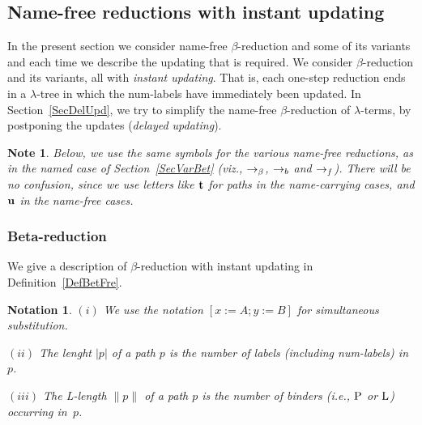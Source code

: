 \documentclass{article}
\theoremstyle{plain}
\newtheorem{Not}[The]{Notation}
\newtheorem{Note}[The]{Note}
\theoremstyle{definition}
\begin{document}
\subsection{Name-free reductions with instant updating}

In the present section we consider name-free $\beta$-reduction and some of its variants and each time we describe the updating that is required. We consider $\beta$-reduction and its variants, all with {\it instant updating\/}. That is, each one-step reduction ends in a $\lambda$-tree in which the num-labels have immediately been updated. In Section~\ref{SecDelUpd}, we try to simplify the name-free $\beta$-reduction of $\lambda$-terms, by postponing the updates ({\it delayed
updating\/}).

\begin{Note}
Below, we use the same symbols for the various name-free reductions, as in the {\em named\/} case of Section~\ref{SecVarBet} (viz., $\rightarrow_{\beta}$, $\rightarrow_b$ and $\rightarrow_f$). There will be no confusion, since we use letters like ${\bf t}$ for paths in the name-carrying cases, and ${\bf u}$ in the name-free cases.
\end{Note}

\subsubsection{Beta-reduction}\label{FreBetRed}

We give a description of $\beta$-reduction with instant updating in Definition~\ref{DefBetFre}.

\begin{Not}
$(i)$ We use the notation $[x := A; y := B]$ for {\it simultaneous substitution\/}.

$(ii)$ The {\em lenght\/} $| p |$ of a path $p$ is the number of labels (including num-labels) in $p$.

$(iii)$ The {\em {\rm L}-length\/} $\lVert p \lVert$ of a path $p$ is the number of binders (i.e., ${\rm P}$ or ${\rm L}$) occurring in~$p$.
\end{Not}
\end{document}
